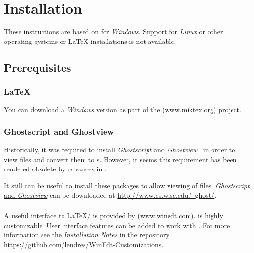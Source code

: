 \chapter{Installation}
These instructions are based on \miktex{} for \emph{Windows}.  Support for \emph{Linux} or other operating systems or \LaTeX{} installations is not available.

\section{Prerequisites}
\subsection{\LaTeX}
You can download a \emph{Windows} version as part of the \href{https://miktex.org}{\miktex{}} (www.miktex.org)\index{\miktex} project.


\subsection{Ghostscript and Ghostview}
Historically, it was required to install \emph{Ghostscript} and \emph{Ghostview}~\cite{ref:kopka1999a} in order to view  files and convert them to s.  However, it seems this requirement has been rendered obsolete by advances in \miktex{}.

It still can be useful to install these packages to allow viewing of  files.  \href{http://www.cs.wisc.edu/~ghost/}{\emph{Ghostscript} and \emph{Ghostview}} can be downloaded at \href{http://www.cs.wisc.edu/~ghost/}{http://www.cs.wisc.edu/~ghost/}.

\subsection{\winedt}
A useful interface to \LaTeX{}/\miktex{} is provided by \href{https://www.winedt.com}{\winedt} (\href{www.winedt.com}{www.winedt.com}).  \winedt{} is highly customizable.  User interface features can be added to work with \lelatex{}.  For more information see the \emph{Installation Notes} in the repository \href{WinEdt Customizations}{https://github.com/lendres/WinEdt-Customizations}.


